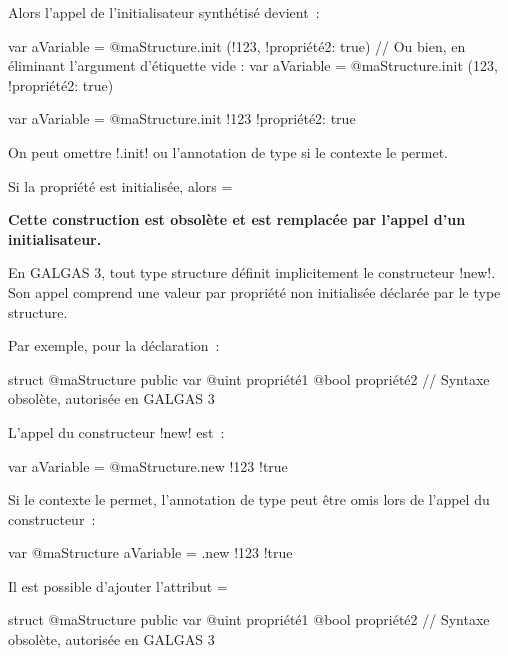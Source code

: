 Alors l'appel de l'initialisateur synthétisé devient~:
\begin{galgas4}
var aVariable = @maStructure.init (!123, !propriété2: true)
// Ou bien, en éliminant l'argument d'étiquette vide :
var aVariable = @maStructure.init (123, !propriété2: true)
\end{galgas4}
\begin{galgas3}
var aVariable = @maStructure.init {!123 !propriété2: true}
\end{galgas3}

On peut omettre \ggst!.init! ou l'annotation de type si le contexte le permet.

Si la propriété est initialisée, alors \ggst=%









{\bf Cette construction est obsolète et est remplacée par l'appel d'un initialisateur.}

En GALGAS 3, tout type structure définit implicitement le constructeur \ggst!new!. Son appel comprend une valeur par propriété non initialisée déclarée par le type structure.

Par exemple, pour la déclaration~:
\begin{galgas3}
struct @maStructure {
  public var @uint propriété1
  @bool propriété2 // Syntaxe obsolète, autorisée en GALGAS 3
}
\end{galgas3}

L'appel du constructeur \ggst!new! est~:
\begin{galgas3}
var aVariable = @maStructure.new {!123 !true}
\end{galgas3}

Si le contexte le permet, l'annotation de type peut être omis lors de l'appel du constructeur~:
\begin{galgas3}
var @maStructure aVariable = .new {!123 !true}
\end{galgas3}

Il est possible d'ajouter l'attribut \ggst=%
\begin{galgas3}
struct @maStructure {
  public var @uint propriété1 %
  @bool propriété2 // Syntaxe obsolète, autorisée en GALGAS 3
}
\end{galgas3}

